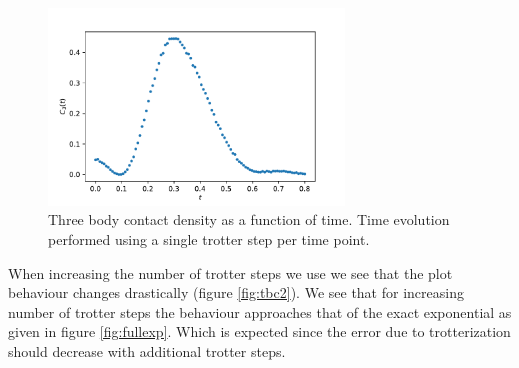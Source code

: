 \documentclass[10 pt, a4paper]{article}
\begin{document}
\begin{figure}[H]
\centering
	\includegraphics[width=0.7\textwidth]{ThreeBodyContactGates1}
\caption{Three body contact density as a function of time. Time evolution performed using a single trotter step per time point.} \label{fig:tbc1}
\end{figure}

When increasing the number of trotter steps we use we see that the plot behaviour changes drastically (figure \ref{fig:tbc2}). We see that for increasing number of trotter steps the behaviour approaches that of the exact exponential as given in figure \ref{fig:fullexp}. Which is expected since the error due to trotterization should decrease with additional trotter steps.
\end{document}
